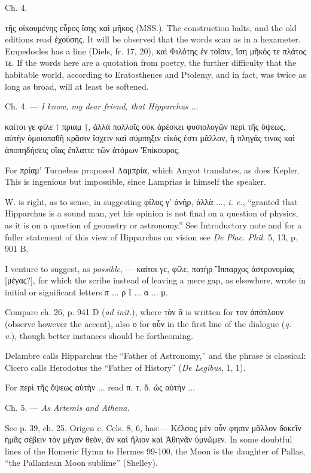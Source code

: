 \documentclass[a4paper, 11pt, oneside, polutonikogreek, english]{article}
\begin{document}
Ch. 4.

τῆς οἰκουμένης εὖρος ἴσης καὶ μῆκος (MSS.). The construction halts, and the old editions read ἐχούσης. It will be observed that the words scan as in a hexameter. Empedocles has a line (Diels, fr. 17, 20), καὶ Φιλότης ἐν τοῖσιν, ἴση μῆκός τε πλάτος τε. If the words here are a quotation from poetry, the further difficulty that the habitable world, according to Eratosthenes and Ptolemy, and in fact, was twice as long as broad, will at least be softened.

Ch. 4. --- \emph{I know, my dear friend, that Hipparchus} ...

καίτοι γε φίλε † πριαμ †, ἀλλὰ πολλοῖς οὐκ ἀρέσκει φυσιολογῶν περὶ τῆς ὄψεως, αὐτὴν ὁμοιοπαθῆ κρᾶσιν ἴσχειν καὶ σύμπηξιν εἰκός ἐστι μᾶλλον, ἢ πληγάς τινας καὶ ἀποπηδήσεις οἵας ἔπλαττε τῶν ἀτόμων Ἐπίκουρος.

For πρίαμ' Turnebus proposed Λαμπρία, which Amyot translates, as does Kepler. This is ingenious but impossible, since Lamprias is himself the speaker.

W. is right, as to sense, in suggesting φίλος γ' ἀνὴρ, ἀλλὰ ..., \emph{i. e.}, ``granted that Hipparchus is a sound man, yet his opinion is not final on a question of physics, as it is on a question of geometry or astronomy.'' See Introductory note and for a fuller statement of this view of Hipparchus on vision see \emph{De Plac. Phil.} 5, 13, p. 901 B.

I venture to suggest, as \emph{possible}, --- καίτοι γε, φίλε, πατὴρ Ἵππαρχος ἀστρονομίας [μέγας?], for which the scribe instead of leaving a mere gap, as elsewhere, wrote in initial or significant letters π ... ρ Ι ... α ... μ.

Compare ch. 26, p. 941 D (\emph{ad init.}), where τὸν ἄ is written for τον ἀπόπλουν (observe however the accent), also ο for οὖν in the first line of the dialogue (\emph{q. v.}), though better instances should be forthcoming.

Delambre calls Hipparchus the ``Father of Astronomy,'' and the phrase is classical: Cicero calls Herodotus the ``Father of History'' (\emph{De Legibus}, 1, 1).

For περὶ τῆς ὄψεως αὐτὴν ... read π. τ. ὄ. ὡς αὐτὴν ...

Ch. 5. --- \emph{As Artemis and Athena.}

See p. 39, ch. 25. Origen c. Cels. 8, 6, has:--- Κέλσος μὲν οὖν φησιν μᾶλλον δοκεῖν ἡμᾶς σέβειν τὸν μέγαν θεὸν, ἂν καὶ ἥλιον καὶ Ἀθηνᾶν ὑμνῶμεν. In some doubtful lines of the Homeric Hymn to Hermes 99-100, the Moon is the daughter of Pallas, ``the Pallantean Moon sublime'' (Shelley).
\end{document}
